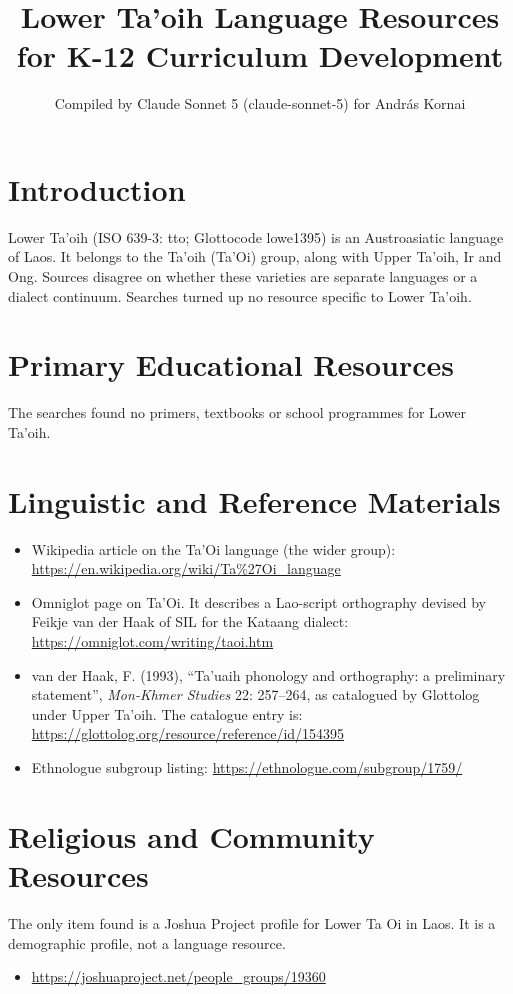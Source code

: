 \documentclass[12pt]{article}
\title{Lower Ta'oih Language Resources for K-12 Curriculum Development}
\author{Compiled by Claude Sonnet 5 (claude-sonnet-5) for Andr\'as Kornai}
\date{}
\begin{document}
\maketitle

\section{Introduction}
Lower Ta'oih (ISO 639-3: tto; Glottocode lowe1395) is an Austroasiatic language of Laos. It belongs to the Ta'oih (Ta'Oi) group, along with Upper Ta'oih, Ir and Ong. Sources disagree on whether these varieties are separate languages or a dialect continuum. Searches turned up no resource specific to Lower Ta'oih.

\section{Primary Educational Resources}
The searches found no primers, textbooks or school programmes for Lower Ta'oih.

\section{Linguistic and Reference Materials}
\begin{itemize}
\item Wikipedia article on the Ta'Oi language (the wider group): \url{https://en.wikipedia.org/wiki/Ta%27Oi_language}
\item Omniglot page on Ta'Oi. It describes a Lao-script orthography devised by Feikje van der Haak of SIL for the Kataang dialect: \url{https://omniglot.com/writing/taoi.htm}
\item van der Haak, F. (1993), ``Ta'uaih phonology and orthography: a preliminary statement'', \emph{Mon-Khmer Studies} 22: 257--264, as catalogued by Glottolog under Upper Ta'oih. The catalogue entry is: \url{https://glottolog.org/resource/reference/id/154395}
\item Ethnologue subgroup listing: \url{https://ethnologue.com/subgroup/1759/}
\end{itemize}

\section{Religious and Community Resources}
The only item found is a Joshua Project profile for Lower Ta Oi in Laos. It is a demographic profile, not a language resource.
\begin{itemize}
\item \url{https://joshuaproject.net/people_groups/19360}
\end{itemize}
\end{document}
